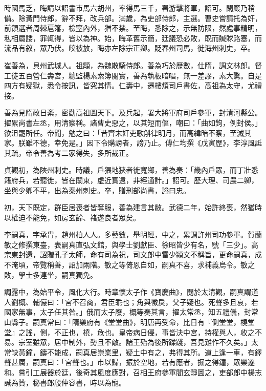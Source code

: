 \begin{pinyinscope}
 時國馬乏，晦請以詔書市馬六胡州，率得馬三千，署游擊將軍，詔可。閑廄乃稍備。除黃門侍郎，辭不拜，改兵部。滿歲，為吏部侍郎，主選。曹史嘗請托為奸，前領選者周棘扈籓，檢窒內外，猶不禁。至晦，悉除之，示無防限，然處事精明，私相屬諉，罪輒得，皆以為神。始，晦革舊示簡，廷議恐必敗，既而贓賕路塞，而流品有敘，眾乃伏。皎被放，晦亦左除宗正卿。貶春州司馬，徙海州刺史，卒。



 崔善為，貝州武城人。祖顒，為魏散騎侍郎。善為巧於歷數，仕隋，調文林郎。督工徒五百營仁壽宮，總監楊素索簿閱實，善為執板暗唱，無一差謬，素大驚。自是四方有疑獄，悉令按訊，皆究其情。仁壽中，遷樓煩司戶書佐，高祖為太守，尤禮接。



 善為見隋政日紊，密勸高祖圖天下。及兵起，署大將軍府司戶參軍，封清河縣公。擢累尚書左丞，用清察稱。諸曹史惡之，以其短而傴，嘲曰：「曲如鉤，例封侯。」欲沮罷所任。帝聞，勉之曰：「昔齊末奸吏歌斛律明月，而高緯暗不察，至滅其家。朕雖不德，幸免是。」因下令購謗者，謗乃止。傅仁均撰《戊寅歷》，李淳風詆其疏，帝令善為考二家得失，多所裁正。



 貞觀初，為陜州刺史。時議，戶猥地狹者徙寬鄉，善為奏：「畿內戶眾，而丁壯悉籍府兵，若聽徙，皆在關東，虛近實遠，非經通計。」詔可。歷大理、司農二卿，坐與少卿不平，出為秦州刺史。卒，贈刑部尚書，謚曰忠。



 初，天下既定，群臣居喪者皆奪服，善為建言其敝。武德二年，始許終喪，然猶時以權迫不能免，如房玄齡、褚遂良者眾矣。



 李嗣真，字承胄，趙州柏人人。多藝數，舉明經，中之，累調許州司功參軍。賀蘭敏之修撰東臺，表嗣真直弘文館，與學士劉獻臣、徐昭皆少有名，號「三少」。高宗東封還，詔贈孔子太師，命有司為祝，司文郎中雷少潁文不稱旨，更命嗣真，成不淹頃，帝覽稱善，詔加兩階。敏之等倚恩自如，嗣真不喜，求補義烏令。敏之敗，學士多連坐，嗣真獨免。



 調露中，為始平令，風化大行。時章懷太子作《寶慶曲》，閱於太清觀，嗣真謂道人劉概、輔儼曰：「宮不召商，君臣乖也；角與徵戾，父子疑也。死聲多且哀，若國家無事，太子任其咎。」俄而太子廢，概等奏其言，擢太常丞，知五禮儀，封常山縣子。嗣真常曰：「隋樂府有《堂堂曲》，明唐再受命，比日有『側堂堂，橈堂堂』之謠，側，不正也，橈，危也。皇帝病日侵，事皆決中宮，持權與人，收之不易。宗室雖眾，居中制外，勢且不敵。諸王殆為後所蹂踐，吾見難作不久矣。」太常缺黃鐘，鑄不能成，嗣真居崇業里，疑土中有之，弗得其所。道上逢一車，有鐸聲甚厲，嗣真曰：「宮聲也。」市以歸，振於空地，若有應者，掘之得鐘，眾樂遂和。嘗引工展器於廷，後奇其風度應對，召相王府參軍閻玄靜圖之，吏部郎中楊志誠為贊，秘書郎殷仲容書，時以為寵。




\end{pinyinscope}
